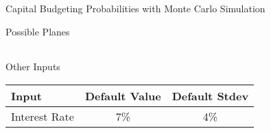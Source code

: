 \documentclass[]{article}
\begin{document}
\begin{section}{Capital Budgeting Probabilities with Monte Carlo Simulation}
\begin{subsection}{Possible Planes}
\begin{center}
\begin{tabular}{l|ccccc}
\bottomrule
\end{tabular}
\end{center}
\end{subsection}
\begin{subsection}{Other Inputs}
\begin{center}
\begin{tabular}{l|cc}
\toprule
Input & Default Value & Default Stdev\\

\midrule
Interest Rate & 7\% & 4\%\\

\bottomrule
\end{tabular}
\end{center}
\end{subsection}
\end{section}
\end{document}
